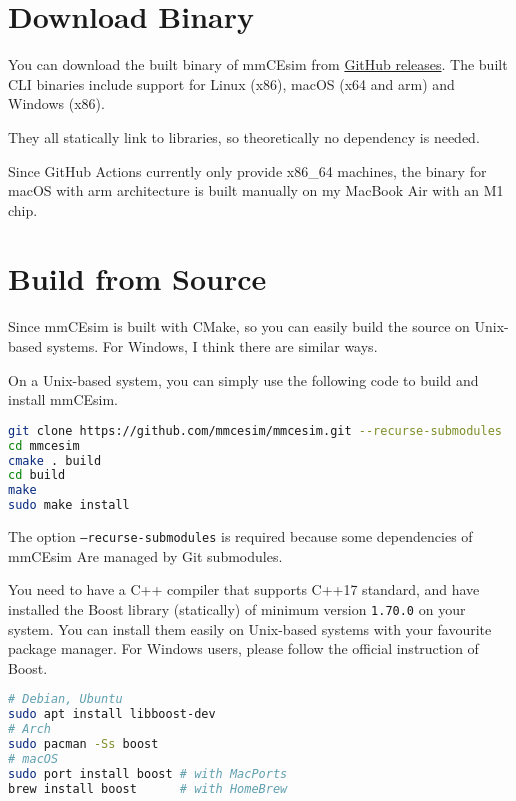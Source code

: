 \section{Download Binary}
You can download the built binary of mmCEsim from \href{https://github.com/mmcesim/mmcesim/releases}{GitHub releases}.
The built CLI binaries include support for Linux (x86), macOS (x64 and arm) and Windows (x86).

They all statically link to libraries, so theoretically no dependency is needed.

\begin{tip}[Note]
  Since GitHub Actions currently only provide x86\_64 machines,
  the binary for macOS with arm architecture is built manually on my MacBook Air with an M1 chip.
\end{tip}

\section{Build from Source}

Since mmCEsim is built with CMake, so you can easily build the source on Unix-based systems.
For Windows, I think there are similar ways.

On a Unix-based system, you can simply use the following code to build and install mmCEsim.
\begin{lstlisting}[language=sh, morekeywords={git, cmake, make, sudo}, alsoletter={.}]
git clone https://github.com/mmcesim/mmcesim.git --recurse-submodules
cd mmcesim
cmake . build
cd build
make
sudo make install
\end{lstlisting}

\begin{remark}
  The option \texttt{--recurse-submodules} is required because some dependencies of mmCEsim
  Are managed by Git submodules.
\end{remark}

You need to have a C++ compiler that supports C++17 standard,
and have installed the Boost library (statically) of minimum version \texttt{1.70.0} on your system.
You can install them easily on Unix-based systems with your favourite package manager.
For Windows users, please follow the official instruction of Boost.
\begin{lstlisting}[language=sh, morekeywords={sudo, apt, pacman, port, brew}]
# Debian, Ubuntu
sudo apt install libboost-dev
# Arch
sudo pacman -Ss boost
# macOS
sudo port install boost # with MacPorts
brew install boost      # with HomeBrew
\end{lstlisting}

